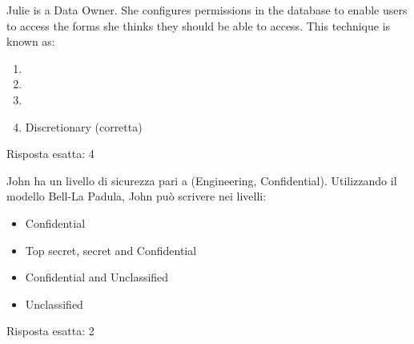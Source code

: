
\begin{Exercise} [
  title={Domanda},
  label={pass3}
 ]

 \Question Julie is a Data Owner. She configures permissions in the database to
enable users to access the forms she thinks they should be able to access. This
technique is known as:
\begin{enumerate}
\item
\item
\item
\item Discretionary (corretta)
\end{enumerate}


\end{Exercise}


\begin{Answer} [
  ref={pass3},
  number={3}
  ]

  \Question Risposta esatta: 4

\end{Answer}


\begin{Exercise} [
  title={Domanda},
  label={pass4}
 ]

 \Question John ha un livello di sicurezza pari a (Engineering, Confidential).
Utilizzando il modello Bell-La Padula, John può scrivere nei livelli:
\begin{itemize}
\item Confidential
\item Top secret, secret and Confidential
\item Confidential and Unclassified
\item Unclassified
\end{itemize}


\end{Exercise}

\begin{Answer} [
  ref={pass4},
  number={4}
  ]

  \Question Risposta esatta: 2

\end{Answer}


